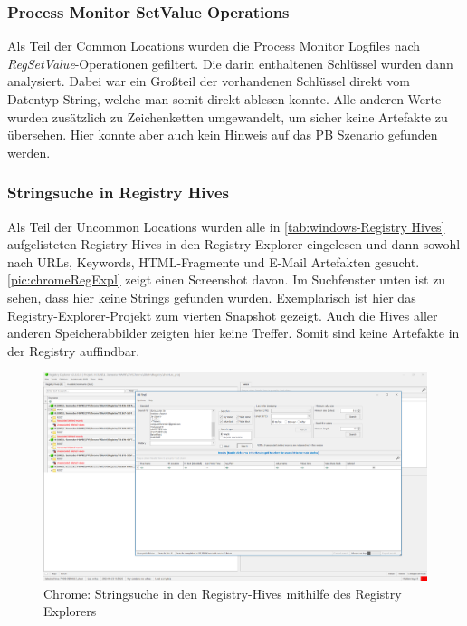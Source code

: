 \begin{appendices}
\subsubsection*{Process Monitor SetValue Operations}\label{chap:anhang-chrome-common-registry}
Als Teil der Common Locations wurden die Process Monitor Logfiles nach \textit{RegSetValue}-Operationen gefiltert. Die darin enthaltenen Schlüssel wurden dann analysiert. Dabei war ein Großteil der vorhandenen Schlüssel direkt vom Datentyp String, welche man somit direkt ablesen konnte. Alle anderen Werte wurden zusätzlich zu Zeichenketten umgewandelt, um sicher keine Artefakte zu übersehen. Hier konnte aber auch kein Hinweis auf das PB Szenario gefunden werden. 

\subsubsection*{Stringsuche in Registry Hives}\label{chap:anhang-chrome-uncommon-registry}
Als Teil der Uncommon Locations wurden alle in \autoref{tab:windows-Registry Hives} aufgelisteten Registry Hives in den Registry Explorer eingelesen und dann sowohl nach URLs, Keywords, HTML-Fragmente und E-Mail Artefakten gesucht. \autoref{pic:chromeRegExpl} zeigt einen Screenshot davon. Im Suchfenster unten ist zu sehen, dass hier keine Strings gefunden wurden. Exemplarisch ist hier das Registry-Explorer-Projekt zum vierten Snapshot gezeigt. Auch die Hives aller anderen Speicherabbilder zeigten hier keine Treffer. Somit sind keine Artefakte in der Registry auffindbar.
\begin{figure}[h!]
	\centering
	\includegraphics[width=\textwidth]{bilder/RegExpl.png}
	\caption{Chrome: Stringsuche in den Registry-Hives mithilfe des Registry Explorers}
	\label{pic:chromeRegExpl}
\end{figure}



\end{appendices}
